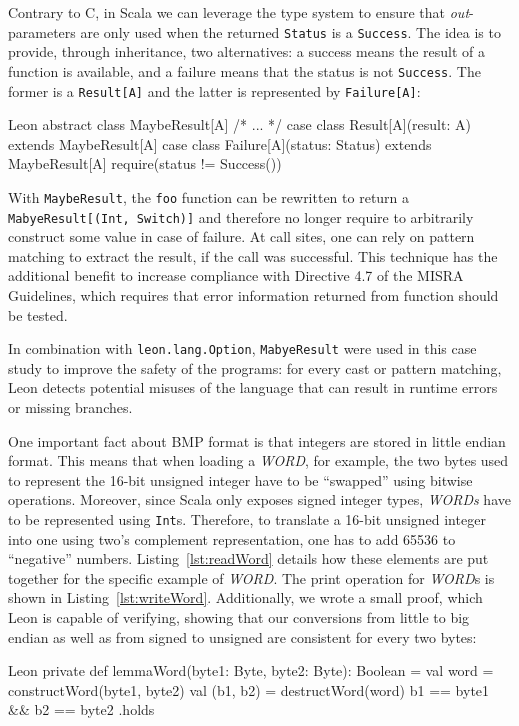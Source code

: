 \documentclass[a4paper,twoside]{article}
\newcommand{\InlineS}[1]{\lstinline[language=Leon]|#1|}
\newcommand{\RefCode}[1]{Listing~\ref{#1}}
\begin{document}
Contrary to C, in Scala we can leverage the type system to ensure that
\emph{out}-parameters are only used when the returned \InlineS{Status} is a
\InlineS{Success}. The idea is to provide, through inheritance, two
alternatives: a success means the result of a function is available, and a
failure means that the status is not \InlineS{Success}. The former is a
\InlineS{Result[A]} and the latter is represented by \InlineS{Failure[A]}:
\begin{ShortCode}{Leon}
abstract class MaybeResult[A] { /* ... */ }
case class Result[A](result: A) extends MaybeResult[A]
case class Failure[A](status: Status) extends MaybeResult[A] {
  require(status != Success())
}
\end{ShortCode}

With \InlineS{MaybeResult}, the \InlineS{foo} function can be rewritten to
return a \InlineS{MabyeResult[(Int, Switch)]} and therefore no longer require to
arbitrarily construct some value in case of failure. At call sites, one can rely
on pattern matching to extract the result, if the call was successful. This
technique has the additional benefit to increase compliance with Directive 4.7
of the MISRA Guidelines, which requires that error information returned from
function should be tested.

In combination with \InlineS{leon.lang.Option}, \InlineS{MabyeResult} were used
in this case study to improve the safety of the programs: for every cast or
pattern matching, Leon detects potential misuses of the language that can result
in runtime errors or missing branches.

One important fact about BMP format is that integers are stored in little endian
format. This means that when loading a \emph{WORD}, for example, the two bytes
used to represent the 16-bit unsigned integer have to be ``swapped'' using
bitwise operations. Moreover, since Scala only exposes signed integer types,
\emph{WORDs} have to be represented using \InlineS{Int}s. Therefore, to
translate a 16-bit unsigned integer into one using two's complement
representation, one has to add 65536 to ``negative'' numbers.
\RefCode{lst:readWord} details how these elements are put together for the
specific example of \emph{WORD}. The print operation for \emph{WORD}s is shown
in \RefCode{lst:writeWord}. Additionally, we wrote a small proof, which Leon is
capable of verifying, showing that our conversions from little to big endian as
well as from signed to unsigned are consistent for every two bytes:
\begin{ShortCode}{Leon}
private def lemmaWord(byte1: Byte, byte2: Byte): Boolean = {
  val word = constructWord(byte1, byte2)
  val (b1, b2) = destructWord(word)
  b1 == byte1 && b2 == byte2
}.holds
\end{ShortCode}
\end{document}

